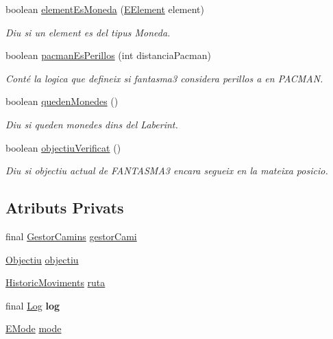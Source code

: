 \begin{DoxyCompactItemize}
boolean \hyperlink{classlogica_1_1_fantasma3_ad393ed909cc000b7b2aa10a5873f3700}{element\+Es\+Moneda} (\hyperlink{enumlogica_1_1enumeracions_1_1_e_element}{E\+Element} element)
\begin{DoxyCompactList}\small\item\em Diu si un element es del tipus Moneda. \end{DoxyCompactList}\item 
boolean \hyperlink{classlogica_1_1_fantasma3_ac81e9a65277b97748b05fbf683e6c71c}{pacman\+Es\+Perillos} (int distancia\+Pacman)
\begin{DoxyCompactList}\small\item\em Conté la logica que defineix si fantasma3 considera perillos a en P\+A\+C\+M\+A\+N. \end{DoxyCompactList}\item 
boolean \hyperlink{classlogica_1_1_fantasma3_a975dd968c3874e23ca8956d3490ae055}{queden\+Monedes} ()
\begin{DoxyCompactList}\small\item\em Diu si queden monedes dins del Laberint. \end{DoxyCompactList}\item 
boolean \hyperlink{classlogica_1_1_fantasma3_a5602880e6a68d98e6a720a094a609538}{objectiu\+Verificat} ()
\begin{DoxyCompactList}\small\item\em Diu si objectiu actual de F\+A\+N\+T\+A\+S\+M\+A3 encara segueix en la mateixa posicio. \end{DoxyCompactList}\end{DoxyCompactItemize}
\subsection*{Atributs Privats}
\begin{DoxyCompactItemize}
\item 
final \hyperlink{classlogica_1_1algoritmica_1_1_gestor_camins}{Gestor\+Camins} \hyperlink{classlogica_1_1_fantasma3_a57dabe0804fa3f0ed00b28f3cab4d6b6}{gestor\+Cami}
\item 
\hyperlink{classlogica_1_1_fantasma3_1_1_objectiu}{Objectiu} \hyperlink{classlogica_1_1_fantasma3_a13e89583eb5f6a4fb3f41595833a9b79}{objectiu}
\item 
\hyperlink{classlogica_1_1historic__moviments_1_1_historic_moviments}{Historic\+Moviments} \hyperlink{classlogica_1_1_fantasma3_a270da1ca223914034c125b12479973b1}{ruta}
\item 
\hypertarget{classlogica_1_1_fantasma3_acfb3b4197723193eb20b7e84f6a74bbe}{final \hyperlink{classlogica_1_1log_1_1_log}{Log} {\bfseries log}}\label{classlogica_1_1_fantasma3_acfb3b4197723193eb20b7e84f6a74bbe}

\item 
\hyperlink{enumlogica_1_1_fantasma3_1_1_e_mode}{E\+Mode} \hyperlink{classlogica_1_1_fantasma3_a42c7e17e87979122ed5c19aa4b2286f8}{mode}
\end{DoxyCompactItemize}
